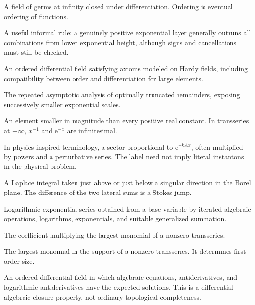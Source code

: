\documentclass[11pt,openany]{book}
\theoremstyle{plain}
\theoremstyle{definition}
\theoremstyle{remark}
\newcommand{\e}{\mathrm{e}}
\begin{document}
\begin{description}[style=nextline,itemsep=0.75em]
\item[Hardy field]
A field of germs at infinity closed under differentiation. Ordering is eventual ordering of functions.

\item[Height wins]
A useful informal rule: a genuinely positive exponential layer generally outruns all combinations from lower exponential height, although signs and cancellations must still be checked.

\item[$H$-field]
An ordered differential field satisfying axioms modeled on Hardy fields, including compatibility between order and differentiation for large elements.

\item[Hyperasymptotics]
The repeated asymptotic analysis of optimally truncated remainders, exposing successively smaller exponential scales.

\item[Infinitesimal]
An element smaller in magnitude than every positive real constant. In transseries at $+\infty$, $x^{-1}$ and $\e^{-x}$ are infinitesimal.

\item[Instanton sector]
In physics-inspired terminology, a sector proportional to $\e^{-kAx}$, often multiplied by powers and a perturbative series. The label need not imply literal instantons in the physical problem.

\item[Lateral Borel sum]
A Laplace integral taken just above or just below a singular direction in the Borel plane. The difference of the two lateral sums is a Stokes jump.

\item[LE-series]
Logarithmic-exponential series obtained from a base variable by iterated algebraic operations, logarithms, exponentials, and suitable generalized summation.

\item[Leading coefficient]
The coefficient multiplying the largest monomial of a nonzero transseries.

\item[Leading monomial or magnitude]
The largest monomial in the support of a nonzero transseries. It determines first-order size.

\item[Liouville closed]
An ordered differential field in which algebraic equations, antiderivatives, and logarithmic antiderivatives have the expected solutions. This is a differential-algebraic closure property, not ordinary topological completeness.


\end{description}
\end{document}
